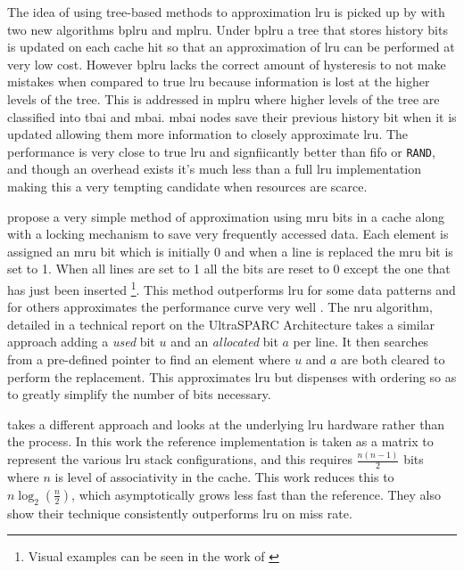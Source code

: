 The idea of using tree-based methods to approximation \gls{lru} is picked up by \citet{ghasemzadehModifiedPseudoLRU2006} with two new algorithms \gls{bplru} and \gls{mplru}. Under \gls{bplru} a tree that stores history bits  is updated on each cache hit so that an approximation of \gls{lru} can be performed at very low cost. However \gls{bplru} lacks the correct amount of hysteresis to not make mistakes when compared to true \gls{lru} because information is lost at the higher levels of the tree. This is addressed in \gls{mplru} where higher levels of the tree are classified into \gls{tbai} and \gls{mbai}. \gls{mbai} nodes save their previous history bit when it is updated allowing them more information to closely approximate \gls{lru}. The performance is very close to true \gls{lru} and signfiicantly better than \gls{fifo} or \texttt{RAND}, and though an overhead exists it's much less than a full \gls{lru} implementation making this a very tempting candidate when resources are scarce.

\citet{malamy1994methods} propose a very simple method of approximation using \gls{mru} bits in a cache along with a locking mechanism to save very frequently accessed data. Each element is assigned an \gls{mru} bit which is initially 0 and when a line is replaced the \gls{mru} bit is set to 1. When all lines are set to 1 all the bits are reset to 0 except the one that has just been inserted \footnote{Visual examples can be seen in the work of \citet{damienStudyDifferentCache2007}}. This method outperforms \gls{lru} for some data patterns and for others approximates the performance curve very well \cite{al-zoubiPerformanceEvaluationCache2004}. The \gls{nru} algorithm, detailed in a technical report on the UltraSPARC Architecture \cite{UltraSPARCT2Supplement2007} takes a similar approach adding a \emph{used} bit $u$ and an \emph{allocated} bit $a$ per line. It then searches from a pre-defined pointer to find an element where $u$ and $a$ are both cleared to perform the replacement. This approximates \gls{lru} but dispenses with ordering so as to greatly simplify the number of bits necessary.

\citet{ghasemzadehPseudoFIFOArchitectureLRU2005} takes a different approach and looks at the underlying \gls{lru} hardware rather than the process. In this work the reference implementation is taken as a matrix to represent the various \gls{lru} stack configurations, and this requires $\frac{n(n-1)}{2}$ bits where $n$ is level of associativity in the cache. This work  reduces this to $n\log_2\left(\frac{n}{2}\right)$, which asymptotically grows less fast than the reference. They also show their technique consistently outperforms \gls{lru} on miss rate.

